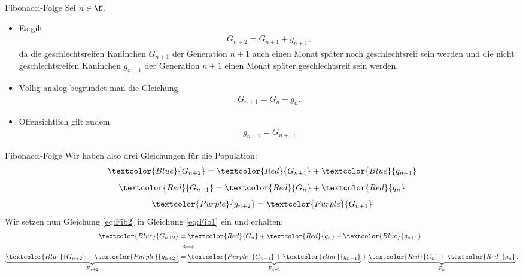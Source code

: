 \begin{frame}[fragile]{Fibonacci-Folge}
Sei $n\in\N$.
\begin{itemize}[<+->]
\item Es gilt
\begin{align*}
    G_{n+2} = G_{n+1} + g_{n+1},
\end{align*}
da die geschlechtsreifen Kaninchen $G_{n+1}$ der Generation $n+1$ auch einen Monat später noch geschlechtsreif sein werden und die nicht geschlechtsreifen Kaninchen $g_{n+1}$ der Generation $n+1$ einen Monat später geschlechtsreif sein werden.
\item Völlig analog begründet man die Gleichung
\begin{align*}
    G_{n+1} = G_{n} + g_{n}.
\end{align*}
\item Offensichtlich gilt zudem
\begin{align*}
    g_{n+2}  = G_{n+1}.
\end{align*}
\end{itemize}
\end{frame}

\begin{frame}[fragile]{Fibonacci-Folge}
Wir haben also drei Gleichungen für die Population:
\begin{align}\label{eq:Fib1}
    \textcolor{Blue}{G_{n+2}} = \textcolor{Red}{G_{n+1}} +  \textcolor{Blue}{g_{n+1}}
\end{align}
\begin{align}\label{eq:Fib2}
    \textcolor{Red}{G_{n+1}} = \textcolor{Red}{G_{n}} + \textcolor{Red}{g_{n}}
\end{align}
\begin{align}\label{eq:Fib3}
    \textcolor{Purple}{g_{n+2}}  = \textcolor{Purple}{G_{n+1}}
\end{align}
Wir setzen nun Gleichung \ref{eq:Fib2} in Gleichung \ref{eq:Fib1} ein und erhalten:
\begin{align*}
    \textcolor{Blue}{G_{n+2}} &= \textcolor{Red}{G_{n}} + \textcolor{Red}{g_{n}} + \textcolor{Blue}{g_{n+1}} \\
    &\iff \\
    \underbrace{\textcolor{Blue}{G_{n+2}} + \textcolor{Purple}{g_{n+2}}}_{F_{n+2}} &= \underbrace{\textcolor{Purple}{G_{n+1}} + \textcolor{Blue}{g_{n+1}}}_{F_{n+1}} + \underbrace{\textcolor{Red}{G_{n}} + \textcolor{Red}{g_{n}}}_{F_n}.
\end{align*}
\end{frame}

